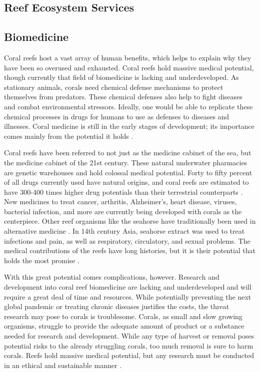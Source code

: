 \documentclass{book}\usepackage{knitr}
\begin{document}
\begin{knitrout}
\begin{kframe}
\section{Reef Ecosystem Services}

\subsection{Biomedicine}

Coral reefs host a vast array of human benefits, which helps to explain why they have been so overused and exhausted. Coral reefs hold massive medical potential, though currently that field of biomedicine is lacking and underdeveloped. As stationary animals, corals need chemical defense mechanisms to protect themselves from predators. These chemical defenses also help to fight diseases and combat environmental stressors. Ideally, one would be able to replicate these chemical processes in drugs for humans to use as defenses to diseases and illnesses. Coral medicine is still in the early stages of development; its importance comes mainly from the potential it holds \citep{AndrewWBruckner_1970}.

Coral reefs have been referred to not just as the medicine cabinet of the sea, but the medicine cabinet of the 21st century. These natural underwater pharmacies are genetic warehouses and hold colossal medical potential. Forty to fifty percent of all drugs currently used have natural origins, and coral reefs are estimated to have 300-400 times higher drug potentials than their terrestrial counterparts \citep{AndrewWBruckner_1970}. New medicines to treat cancer, arthritis, Alzheimer’s, heart disease, viruses, bacterial infection, and more are currently being developed with corals as the centerpiece. Other reef organisms like the seahorse have traditionally been used in alternative medicine \citep{coralreefalliance_2021}. In 14th century Asia, seahorse extract was used to treat infections and pain, as well as respiratory, circulatory, and sexual problems. The medical contributions of the reefs have long histories, but it is their potential that holds the most promise \citep{AndrewWBruckner_1970}.

With this great potential comes complications, however. Research and development into coral reef biomedicine are lacking and underdeveloped and will require a great deal of time and resources. While potentially preventing the next global pandemic or treating chronic diseases justifies the costs, the threat research may pose to corals is troublesome. Corals, as small and slow growing organisms, struggle to provide the adequate amount of product or a substance needed for research and development. While any type of harvest or removal poses potential risks to the already struggling corals, too much removal is sure to harm corals. Reefs hold massive medical potential, but any research must be conducted in an ethical and sustainable manner \citep{AndrewWBruckner_1970}.


\end{kframe}
\end{knitrout}
\end{document}
